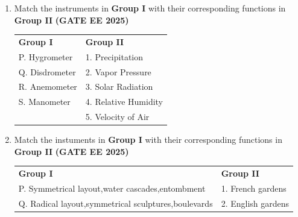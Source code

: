\documentclass[journal,12pt,onecolumn]{IEEEtran}
\theoremstyle{remark}
\begin{document}
{\begin{enumerate}
\\
4. Series of different shapes connected by traditional narrow streets,column screens or arches 
\\
The element of urban design which comprises the above is
\begin{enumerate}
\end{enumerate}
\item Match the instruments in \textbf{Group I} with their corresponding functions in \textbf{Group II} \hfill \textbf{(GATE EE 2025)}
\\
\begin{tabular}{p{}p{}}
\textbf{Group I} & \textbf{Group II}\\
P. Hygrometer & 1. Precipitation  \\
Q. Disdrometer  & 2. Vapor Pressure\\
R. Anemometer  & 3. Solar Radiation\\
S. Manometer  & 4. Relative Humidity\\
              & 5. Velocity of Air\\
\end{tabular}
\begin{enumerate}
\end{enumerate}
\item Match the instuments in \textbf{Group I} with their corresponding functions in \textbf{Group II} \hfill \textbf{(GATE EE 2025)}
\\
\begin{tabular}{p{}p{}}
\textbf{Group I}     &\textbf{Group II}  \\
P. Symmetrical layout,water cascades,entombment     & 1. French gardens\\
Q. Radical layout,symmetrical sculptures,boulevards & 2. English gardens\\

\end{tabular}
\end{enumerate}}
\end{document}
